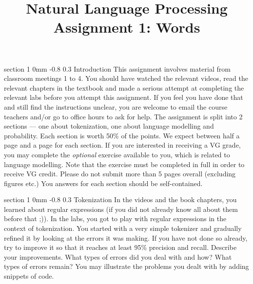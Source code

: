 \documentclass[11pt]{article}
\title{{\LARGE Natural Language Processing}\\[1.5mm]{\large Assignment 1: Words}}
\author{}
\date{} %
\makeatletter
\renewcommand{\section}{\@startsection
{section}%
{1}%
{0mm}%
{-0.8\baselineskip}%
{0.3\baselineskip}%
{\bfseries\large}}%
\makeatother
\begin{document}


\maketitle
\thispagestyle{empty}
\section{Introduction}
\indent This assignment involves material from classroom meetings 1 to 4. You
should have watched the relevant videos, read the relevant chapters in the
textbook and made a serious attempt at completing the relevant labs before you
attempt this assignment. If you feel you have done that and still find the
instructions unclear, you are welcome to email the course teachers and/or go to
office hours to ask for help. The assignment is split into 2 sections --- one
about tokenization, one about language modelling and probability. Each section
is worth 50\% of the points. We expect between half a page and a page for each
section. If you are interested in receiving a VG grade, you may complete the
\textit{optional} exercise available to you, which is related to language
modelling. Note that the exercise must be completed in full in order to receive VG
credit. Please do not submit more than 5 pages overall (excluding figures etc.) You
answers %
for each section should be self-contained.

\section{Tokenization}
In the videos and the book chapters, you learned about regular
expressions (if you did not already know all about them before that
;)). In the labs, you got to play with regular expressions in the
context of tokenization.  You started with a very simple tokenizer and
gradually refined it by looking at the errors it was making.  If you
have not done so already, try to improve it so that it reaches at
least 95\% precision and recall. Describe your improvements. 
What types of errors did you deal with and how? What types of errors 
remain? You may illustrate the problems you dealt with by adding snippets
of code.
\end{document}
